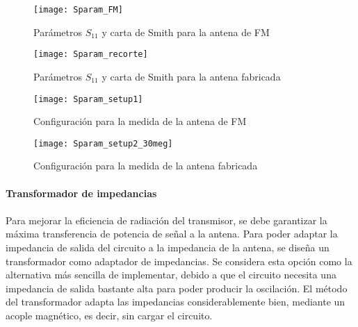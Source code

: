 \begin{figure}[h!]
    \centering
    \texttt{[image: Sparam\_FM]}
    \caption{Parámetros $S_{11}$ y carta de Smith para la antena de FM}
    \label{fig:Sparam_fm}
\end{figure}

\begin{figure}[h!]
    \centering
    \texttt{[image: Sparam\_recorte]}
	\caption{Parámetros $S_{11}$ y carta de Smith para la antena fabricada}
    \label{fig:Sparam_recorte}
\end{figure}

\begin{figure}[h!]
    \centering
    \begin{minipage}{0.35\textwidth}
        \centering
    \texttt{[image: Sparam\_setup1]}
	    \caption{Configuraci\'on para la medida de la antena de FM}
        \label{fig:setup1}
    \end{minipage}
    \hfill
    \begin{minipage}{0.35\textwidth}
        \centering
        \texttt{[image: Sparam\_setup2\_30meg]}
        \caption{Configuraci\'on para la medida de la antena fabricada}
        \label{fig:setup2}
    \end{minipage}
\end{figure}
\paragraph{Transformador de impedancias}
\paragraph{}
Para mejorar la eficiencia de radiación del transmisor, se debe garantizar la máxima transferencia de potencia de señal a la antena.
Para poder adaptar la impedancia de salida del circuito a la impedancia de la antena, se diseña un transformador como adaptador de impedancias. 
Se considera esta opción como la alternativa más sencilla de implementar, debido a que el circuito necesita una impedancia de salida bastante alta para poder producir la oscilación.
El método del transformador adapta las impedancias considerablemente bien, mediante un acople magnético, es decir, sin cargar el circuito.

